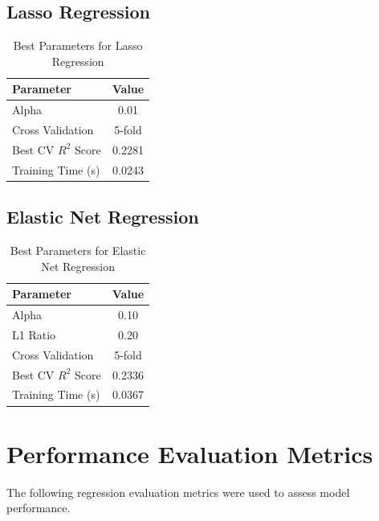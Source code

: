 \documentclass{article}
\begin{document}

\subsection{Lasso Regression}

\begin{table}[H]
\centering
\caption{Best Parameters for Lasso Regression}
\begin{tabular}{|l|c|}
\hline
Parameter & Value\\
\hline
Alpha & 0.01\\
Cross Validation & 5-fold\\
Best CV $R^2$ Score & 0.2281\\
Training Time (s) & 0.0243\\
\hline
\end{tabular}
\end{table}


\subsection{Elastic Net Regression}

\begin{table}[H]
\centering
\caption{Best Parameters for Elastic Net Regression}
\begin{tabular}{|l|c|}
\hline
Parameter & Value\\
\hline
Alpha & 0.10\\
L1 Ratio & 0.20\\
Cross Validation & 5-fold\\
Best CV $R^2$ Score & 0.2336\\
Training Time (s) & 0.0367\\
\hline
\end{tabular}
\end{table}

\section{Performance Evaluation Metrics}

The following regression evaluation metrics were used to assess model performance.
\end{document}

